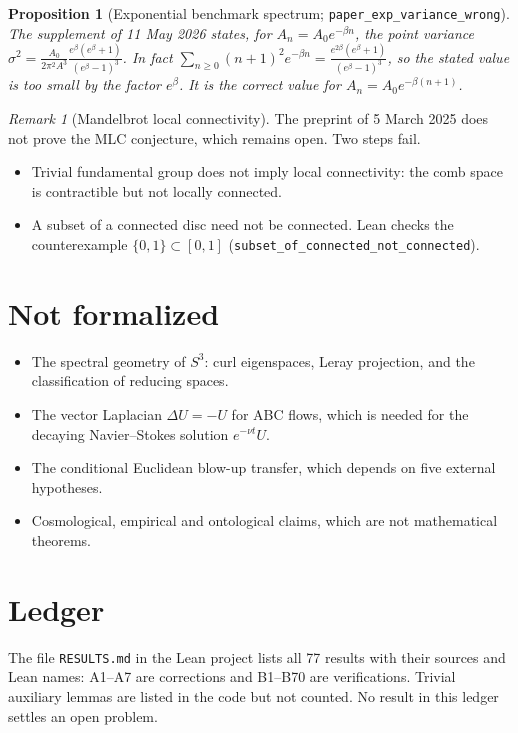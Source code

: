\documentclass[11pt]{article}
\newtheorem{proposition}[theorem]{Proposition}
\theoremstyle{remark}
\newtheorem{remark}[theorem]{Remark}
\newcommand{\lean}[1]{\texttt{#1}}
\begin{document}
\begin{proposition}[Exponential benchmark spectrum; \lean{paper\_exp\_variance\_wrong}]
The supplement of 11 May 2026 states, for $A_n=A_0e^{-\beta n}$, the point variance
$\sigma^2=\frac{A_0}{2\pi^2A^3}\frac{e^\beta(e^\beta+1)}{(e^\beta-1)^3}$. In fact
$\sum_{n\ge0}(n+1)^2e^{-\beta n}=\frac{e^{2\beta}(e^\beta+1)}{(e^\beta-1)^3}$, so the stated
value is too small by the factor $e^\beta$. It is the correct value for
$A_n=A_0e^{-\beta(n+1)}$.
\end{proposition}

\begin{remark}[Mandelbrot local connectivity]
The preprint of 5 March 2025 does not prove the MLC conjecture, which remains open. Two
steps fail.
\begin{itemize}
\item Trivial fundamental group does not imply local connectivity: the comb space is
contractible but not locally connected.
\item A subset of a connected disc need not be connected. Lean checks the counterexample
$\{0,1\}\subset[0,1]$ (\lean{subset\_of\_connected\_not\_connected}).
\end{itemize}
\end{remark}

\section{Not formalized}
\begin{itemize}
\item The spectral geometry of $S^3$: curl eigenspaces, Leray projection, and the
classification of reducing spaces.
\item The vector Laplacian $\Delta U=-U$ for ABC flows, which is needed for the decaying
Navier--Stokes solution $e^{-\nu t}U$.
\item The conditional Euclidean blow-up transfer, which depends on five external hypotheses.
\item Cosmological, empirical and ontological claims, which are not mathematical theorems.
\end{itemize}

\section{Ledger}
The file \lean{RESULTS.md} in the Lean project lists all 77 results with their sources and
Lean names: A1--A7 are corrections and B1--B70 are verifications. Trivial auxiliary lemmas are
listed in the code but not counted. No result in this ledger settles an open problem.
\end{document}
